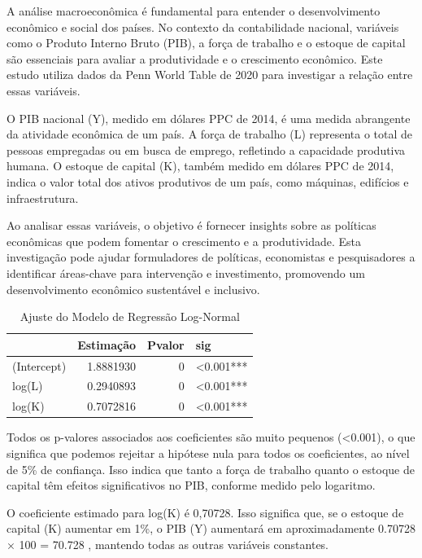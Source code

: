 \documentclass[
  letterpaper,
  DIV=11,
  numbers=noendperiod]{scrreprt}
\begin{document}
A análise macroeconômica é fundamental para entender o desenvolvimento
econômico e social dos países. No contexto da contabilidade nacional,
variáveis como o Produto Interno Bruto (PIB), a força de trabalho e o
estoque de capital são essenciais para avaliar a produtividade e o
crescimento econômico. Este estudo utiliza dados da Penn World Table de
2020 para investigar a relação entre essas variáveis.

O PIB nacional (Y), medido em dólares PPC de 2014, é uma medida
abrangente da atividade econômica de um país. A força de trabalho (L)
representa o total de pessoas empregadas ou em busca de emprego,
refletindo a capacidade produtiva humana. O estoque de capital (K),
também medido em dólares PPC de 2014, indica o valor total dos ativos
produtivos de um país, como máquinas, edifícios e infraestrutura.

Ao analisar essas variáveis, o objetivo é fornecer insights sobre as
políticas econômicas que podem fomentar o crescimento e a produtividade.
Esta investigação pode ajudar formuladores de políticas, economistas e
pesquisadores a identificar áreas-chave para intervenção e investimento,
promovendo um desenvolvimento econômico sustentável e inclusivo.

\begin{longtable}[]{@{}lrrl@{}}

\caption{\label{tbl-t2}Ajuste do Modelo de Regressão Log-Normal}

\tabularnewline

\toprule\noalign{}
& Estimação & Pvalor & sig \\
\midrule\noalign{}
\endhead
\bottomrule\noalign{}
\endlastfoot
(Intercept) & 1.8881930 & 0 & \textless0.001*** \\
log(L) & 0.2940893 & 0 & \textless0.001*** \\
log(K) & 0.7072816 & 0 & \textless0.001*** \\

\end{longtable}

Todos os p-valores associados aos coeficientes são muito pequenos
(\textless0.001), o que significa que podemos rejeitar a hipótese nula
para todos os coeficientes, ao nível de 5\% de confiança. Isso indica
que tanto a força de trabalho quanto o estoque de capital têm efeitos
significativos no PIB, conforme medido pelo logaritmo.

O coeficiente estimado para log(K) é 0,70728. Isso significa que, se o
estoque de capital (K) aumentar em 1\%, o PIB (Y) aumentará em
aproximadamente 0.70728 × 100 = 70.728 , mantendo todas as outras
variáveis constantes.
\end{document}
